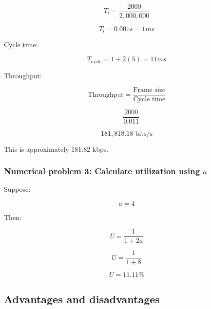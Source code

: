 \[
T_t=\frac{2000}{2,000,000}
\]





\[
T_t=0.001s=1ms
\]



Cycle time:



\[
T_{\text{cycle}}=1+2(5)=11ms
\]



Throughput:



\[
\text{Throughput}=\frac{\text{Frame size}}{\text{Cycle time}}
\]





\[
=\frac{2000}{0.011}
\]





\[
\boxed{181,818.18\text{ bits/s}}
\]



This is approximately 181.82 kbps.

\subsubsection{\textbf{Numerical problem 3: Calculate utilization using }$a$}

Suppose:



\[
a=4
\]



Then:



\[
U=\frac{1}{1+2a}
\]





\[
U=\frac{1}{1+8}
\]





\[
\boxed{U=11.11\%}
\]



\subsection{Advantages and disadvantages}


